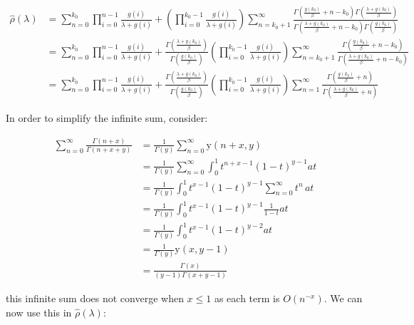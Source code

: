 \documentclass[
  sn-basic,
]{sn-jnl}
\theoremstyle{plain}
\theoremstyle{remark}
\begin{document}
\begin{align*}
\hat\rho(\lambda) &= \sum_{n=0}^{k_0}\prod_{i=0}^{n-1}\frac{g(i)}{\lambda+g(i)} + \left(\prod_{i=0}^{k_0-1}\frac{g(i)}{\lambda+g(i)}\right)\sum_{n=k_0+1}^\infty\frac{\Gamma\left(\frac{g(k_0)}{\beta}+n-k_0\right)\Gamma\left(\frac{\lambda+g(k_0)}{\beta}\right)}{\Gamma\left(\frac{\lambda+g(k_0)}{\beta}+n-k_0\right)\Gamma\left(\frac{g(k_0)}{\beta}\right)}\\
&= \sum_{n=0}^{k_0}\prod_{i=0}^{n-1}\frac{g(i)}{\lambda+g(i)} + \frac{\Gamma\left(\frac{\lambda+g(k_0)}{\beta}\right)}{\Gamma\left(\frac{g(k_0)}{\beta}\right)}\left(\prod_{i=0}^{k_0-1}\frac{g(i)}{\lambda+g(i)}\right)\sum_{n=k_0+1}^\infty\frac{\Gamma\left(\frac{g(k_0)}{\beta}+n-k_0\right)}{\Gamma\left(\frac{\lambda+g(k_0)}{\beta}+n-k_0\right)}\\
&=\sum_{n=0}^{k_0}\prod_{i=0}^{n-1}\frac{g(i)}{\lambda+g(i)} + \frac{\Gamma\left(\frac{\lambda+g(k_0)}{\beta}\right)}{\Gamma\left(\frac{g(k_0)}{\beta}\right)}\left(\prod_{i=0}^{k_0-1}\frac{g(i)}{\lambda+g(i)}\right)\sum_{n=1}^\infty\frac{\Gamma\left(\frac{g(k_0)}{\beta}+n\right)}{\Gamma\left(\frac{\lambda+g(k_0)}{\beta}+n\right)}
\end{align*}

In order to simplify the infinite sum, consider:

\begin{align*}
\sum_{n=0}^\infty\frac{\Gamma(n+x)}{\Gamma(n+x+y)} &=\frac{1}{\Gamma(y)}\sum_{n=0}^\infty \text{y}(n+x,y)\\
&=\frac{1}{\Gamma(y)}\sum_{n=0}^\infty\int_0^1t^{n+x-1}(1-t)^{y-1}at\\
&=\frac{1}{\Gamma(y)}\int_0^1 t^{x-1}(1-t)^{y-1}\sum_{n=0}^\infty t^n\,at\\
&=\frac{1}{\Gamma(y)}\int_0^1 t^{x-1}(1-t)^{y-1}\frac{1}{1-t}at\\
&=\frac{1}{\Gamma(y)}\int_0^1 t^{x-1}(1-t)^{y-2}at\\
&=\frac{1}{\Gamma(y)}\text{y}(x,y-1)\\
&= \frac{\Gamma(x)}{(y-1)\Gamma(x+y-1)}
\end{align*}

this infinite sum does not converge when \(x\le1\) as each term is
\(O(n^{-x})\). We can now use this in \(\hat\rho(\lambda)\):
\end{document}
